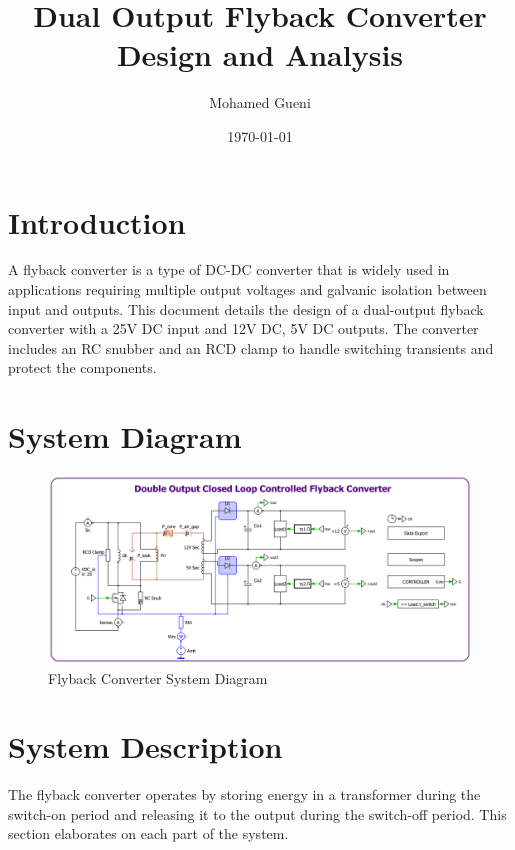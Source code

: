 \documentclass{article}
\begin{document}
\title{Dual Output Flyback Converter Design and Analysis}
\author{Mohamed Gueni}
\date{\today}
\maketitle
\tableofcontents

\section{Introduction}
A flyback converter is a type of DC-DC converter that is widely used in applications requiring multiple output voltages and galvanic isolation between input and outputs. This document details the design of a dual-output flyback converter with a 25V DC input and 12V DC, 5V DC outputs. The converter includes an RC snubber and an RCD clamp to handle switching transients and protect the components.

\section{System Diagram}
\begin{figure}[htbp]
    \centering
    \includegraphics[width=\textwidth]{flyback.jpg}
    \caption{Flyback Converter System Diagram}
    \label{fig:Flyback}
\end{figure}

\section{System Description}
The flyback converter operates by storing energy in a transformer during the switch-on period and releasing it to the output during the switch-off period. This section elaborates on each part of the system.
\end{document}
